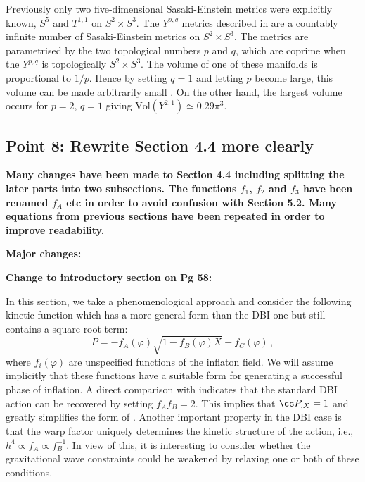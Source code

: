 Previously only two five-dimensional Sasaki-Einstein
metrics were explicitly known, $S^5$ and $T^{1,1}$ on $S^2\times S^3$. The $Y^{p,q}$ metrics
described in  are a countably infinite number of Sasaki-Einstein metrics on
$S^2\times S^3$. The metrics are parametrised by the two topological numbers $p$ and $q$, which are
coprime when the $Y^{p,q}$ is topologically $S^2\times S^3$. The volume of one of these manifolds
is proportional to $1/p$. Hence by setting $q=1$ and letting $p$ become large, this volume can be
made arbitrarily small \cite{gauntlett}. On the other hand, the largest volume occurs for $p=2$,
$q=1$ giving $\mathrm{Vol}(Y^{2,1})\simeq 0.29\pi^3$. 

\subsection{Point 8: Rewrite Section 4.4 more clearly}
\textbf{Many changes have been made to Section 4.4 including splitting the later parts into two
subsections. The functions $f_1$, $f_2$ and $f_3$ have been renamed $f_A$ etc in order to avoid
confusion with Section 5.2. Many equations from previous sections have been repeated in order to
improve readability.}

\textbf{Major changes:}

\textbf{Change to introductory section on Pg 58:}

In this section, we take a phenomenological 
approach and consider the following kinetic function which has a more general form than the DBI one
but still contains a square root term:
% 
\begin{equation}
\label{eq:genaction-corr}
P= -f_A (\varphi ) \sqrt{1-f_B (\varphi ) X} -f_C (\varphi) \,,
\end{equation}
% 
where $f_i (\varphi )$ are unspecified functions of the inflaton 
field. We will assume 
implicitly that these functions have a suitable form for 
generating a successful phase of inflation.
A direct comparison with  
indicates that the standard DBI action can be recovered by setting $f_A f_B =2$. This implies
that $\cs P_{,X} =1$ and greatly simplifies the form of . 
Another important property in the DBI case is that the warp factor uniquely determines 
the kinetic structure of the action, i.e., $h^4 \propto f_A \propto f_B^{-1}$.  
In view of this, it is interesting to consider whether
the gravitational wave constraints could be weakened by relaxing one 
or both of these conditions. 

